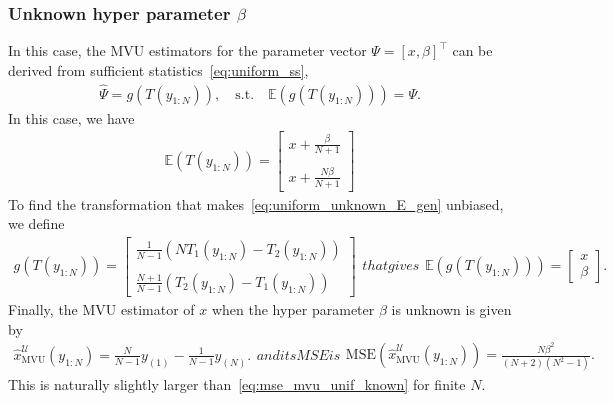 \documentclass{article}
\newcommand{\E}{\mathbb{E}}
\newcommand{\MSE}{\mathrm{MSE}}
\begin{document}
\subsubsection{Unknown hyper parameter $\beta$}\label{subsec:unknown_hyper_parameter_uniform}
In this case, the MVU estimators for the parameter vector $\Psi=[x,\beta]^\top$ can be derived from sufficient statistics~\eqref{eq:uniform_ss},
%
%
\begin{align}
\hat{\Psi}=g(T(y_{1:N})),\quad \mathrm{s.t.}\quad \E\left(g\left(T(y_{1:N})\right)\right) = \Psi.
\end{align}
%
%
In this case, we have
%
%
\begin{align}
\E(T(y_{1:N})) = \begin{bmatrix}
x+\frac{\beta}{N+1}\\\\x+\frac{N\beta}{N+1}
\end{bmatrix}
\label{eq:uniform_unknown_E_gen}
\end{align}
%
%
To find the transformation that makes~\eqref{eq:uniform_unknown_E_gen} unbiased, we define
%
%
\begin{subequations}
	\begin{align}
	g(T(y_{1:N}))=\begin{bmatrix}\frac{1}{N-1}\left(NT_1(y_{1:N})-T_2(y_{1:N})\right)\\\\	\frac{N+1}{N-1}\left(T_2(y_{1:N})-T_1(y_{1:N})\right)\end{bmatrix}
	\end{align}
	that gives
	\begin{align}
	\E\left(g(T(y_{1:N}))\right) = \begin{bmatrix}x\\\beta\end{bmatrix}.
	\end{align}
\end{subequations}
Finally, the MVU estimator of $x$ when the hyper parameter $\beta$ is unknown is given by
\begin{subequations}
	\begin{align}
	\hat{x}_{\mathrm{MVU}}^{\mathcal{U}}(y_{1:N}) = \frac{N}{N-1}y_{(1)} - \frac{1}{N-1} y_{(N)}.
	\end{align}
	and its MSE is
	\begin{align}
	\MSE\left(\hat{x}_{\mathrm{MVU}}^{\mathcal{U}}(y_{1:N})\right) = \frac{N\beta^2}{(N+2)(N^2-1)}.
	\end{align}
\end{subequations}
%
%
This is naturally slightly larger than~\eqref{eq:mse_mvu_unif_known} for finite $N$.
\end{document}
